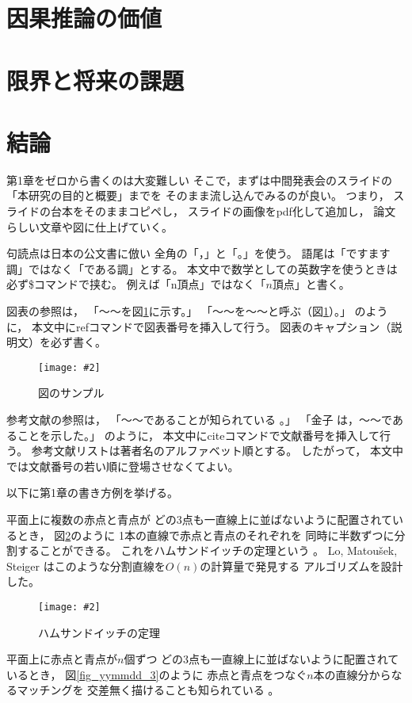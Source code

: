 \documentclass[12pt,a4paper,oneside]{jsbook}
\theoremstyle{plain}
\newcommand{\fig}[4]{
\begin{figure}[H]
\centering
\texttt{[image: \#2]}
\caption{#3}
\label{#4}
\end{figure}
}
\begin{document}
\section{因果推論の価値}
\section{限界と将来の課題}

\section{結論}

第1章をゼロから書くのは大変難しい
そこで，まずは中間発表会のスライドの
「本研究の目的と概要」までを
そのまま流し込んでみるのが良い。
つまり，
スライドの台本をそのままコピペし，
スライドの画像をpdf化して追加し，
論文らしい文章や図に仕上げていく。

句読点は日本の公文書に倣い
全角の「，」と「。」を使う。
語尾は「ですます調」ではなく「である調」とする。
本文中で数学としての英数字を使うときは
必ず\$コマンドで挟む。
例えば「n頂点」ではなく「$n$頂点」と書く。

図表の参照は，
「～～を図\ref{fig_yymmdd_1}に示す。」
「～～を～～と呼ぶ（図\ref{fig_yymmdd_1}）。」
のように，
本文中にrefコマンドで図表番号を挿入して行う。
図表のキャプション（説明文）を必ず書く。

\fig{0.85\textwidth}
{fig_yymmdd_1.pdf}
{図のサンプル}
{fig_yymmdd_1}

参考文献の参照は，
「～～であることが知られている
\cite{佐藤2014}。」
「金子
\cite{Kaneko2000}
は，～～であることを示した。」
のように，
本文中にciteコマンドで文献番号を挿入して行う。
参考文献リストは著者名のアルファベット順とする。
したがって，
本文中では文献番号の若い順に登場させなくてよい。

以下に第1章の書き方例を挙げる。

\bigskip

平面上に複数の赤点と青点が
どの3点も一直線上に並ばないように配置されているとき，
図\ref{fig_yymmdd_2}のように
1本の直線で赤点と青点のそれぞれを
同時に半数ずつに分割することができる。
これをハムサンドイッチの定理という
\cite{Edelsbrunner1987}。
Lo, Matou{\v{s}}ek, Steiger
\cite{Lo1994}
はこのような分割直線を$O(n)$の計算量で発見する
アルゴリズムを設計した。

\fig{0.75\textwidth}
{fig_yymmdd_1.pdf}
{ハムサンドイッチの定理}
{fig_yymmdd_2}

平面上に赤点と青点が$n$個ずつ
どの3点も一直線上に並ばないように配置されているとき，
図\ref{fig_yymmdd_3}のように
赤点と青点をつなぐ$n$本の直線分からなるマッチングを
交差無く描けることも知られている
\cite{Larson1983}。
\end{document}
